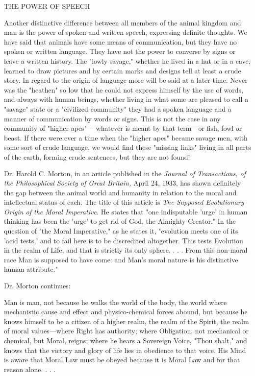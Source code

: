 THE POWER OF SPEECH

Another distinctive difference between all members of the animal kingdom and man is the
power of spoken and written speech, expressing definite thoughts. We have said that animals
have some means of communication, but they have no spoken or written language. They
have not the power to converse by signs or leave a written history. The "lowly savage,"
whether he lived in a hut or in a cave, learned to draw pictures and by certain marks and
designs tell at least a crude story. In regard to the origin of language more will be said at a
later time. Never was the "heathen" so low that he could not express himself by the use of
words, and always with human beings, whether living in what some are pleased to call a
"savage" state or a "civilized community" they had a spoken language and a manner of
communication by words or signs. This is not the case in any community of "higher apes"—
whatever is meant by that term—or fish, fowl or beast. If there were ever a time when the
"higher apes" became savage men, with some sort of crude language, we would find these
"missing links" living in all parts of the earth, forming crude sentences, but they are not
found!

Dr. Harold C. Morton, in an article published in the \textit{Journal of Transactions, of the
Philosophical Society of Great Britain,} April 24, 1933, has shown definitely the gap between
the animal world and humanity in relation to the moral and intellectual status of each. The
title of this article is \textit{The Supposed Evolutionary Origin of the Moral Imperative.} He states
that "one indisputable 'urge' in human thinking has been the 'urge' to get rid of God, the
Almighty Creator." In the question of "the Moral Imperative," as he states it, "evolution
meets one of its 'acid tests,' and to fail here is to be discredited altogether. This tests
Evolution in the realm of Life, and that is strictly its only sphere. . . . From this non-moral
race Man is supposed to have come: and Man's moral nature is his distinctive human
attribute."

Dr. Morton continues:

Man is man, not because he walks the world of the body, the world where mechanistic cause
and effect and physico-chemical forces abound, but because he knows himself to be a citizen
of a higher realm, the realm of the Spirit, the realm of moral values—where Right has
authority; where Obligation, not mechanical or chemical, but Moral, reigns; where he hears a
Sovereign Voice, "Thou shalt," and knows that the victory and glory of life lies in obedience
to that voice. His Mind is aware that Moral Law must be obeyed because it is Moral Law and
for that reason alone. . . .

